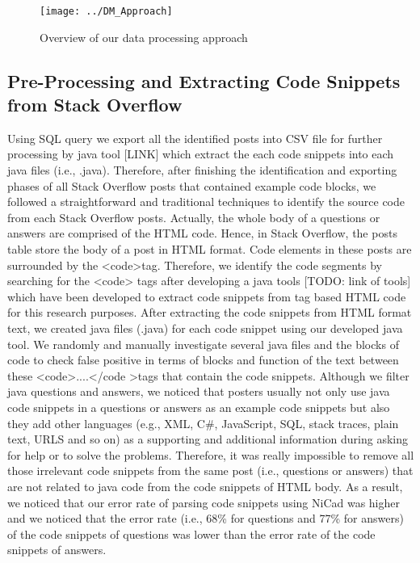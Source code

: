 \documentclass[conference]{IEEEtran}
\begin{document}
	\begin{figure*}[h]
		\centering
		\texttt{[image: ../DM\_Approach]}
		\caption{Overview of our data processing approach}
		\label{fig:dmapproach}
	\end{figure*}
	
	\subsection{Pre-Processing and Extracting Code Snippets from Stack Overflow}\label{AA}
	Using SQL query we export all the identified posts into CSV file for further processing by java tool [LINK] which extract the each code snippets into each java files (i.e., .java). Therefore, after finishing the identification and exporting phases of all Stack Overflow posts that contained example code blocks, we followed a straightforward and traditional techniques to identify the source code from each Stack Overflow posts. Actually, the whole body of a questions or answers are comprised of the HTML code. Hence, in Stack Overflow, the posts table store the body of a post in HTML format. Code elements in these posts are surrounded by the \textless code\textgreater  tag. Therefore, we identify the code segments by searching for the <code> tags after developing a java tools [TODO: link of tools] which have been developed to extract code snippets from tag based HTML code for this research purposes. After extracting the code snippets from HTML format text, we created java files (.java) for each code snippet using our developed java tool. We randomly and manually investigate several java files and the blocks of code to check false positive in terms of blocks and function of the text between these \textless code\textgreater....\textless/code \textgreater tags that contain the code snippets. Although we filter java questions and answers, we noticed that posters usually not only use java code snippets in a questions or answers as an example code snippets but also they add other languages (e.g., XML, C\#, JavaScript, SQL, stack traces, plain text, URLS and so on) as a supporting and additional information during asking for help or to solve the problems. Therefore, it was really impossible to remove all those irrelevant code snippets from the same post (i.e., questions or answers) that are not related to java code from the code snippets of HTML body. As a result, we noticed that our error rate of parsing code snippets using NiCad was higher and we noticed that the error rate (i.e., 68\% for questions and 77\%  for answers) of the code snippets of questions was lower than the error rate of the code snippets of answers. 
	
\end{document}
